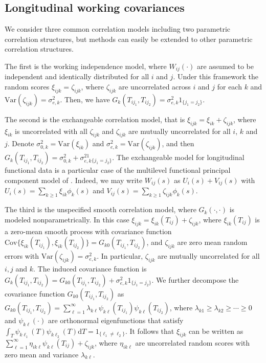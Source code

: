 \documentclass[submit]{smj}
\begin{document}
\subsection{Longitudinal working covariances}
We consider three common correlation models including two parametric correlation structures, but methods can easily be extended to other parametric correlation structures. 

The first is the working independence model, where $W_{ij}(\cdot)$ are assumed to be independent and identically distributed for all $i$ and $j$.
Under this framework the random scores $\xi_{ijk} = \zeta_{ijk}$, where $\zeta_{ijk}$ are uncorrelated across $i$ and $j$ for each $k$ and $\text{Var}(\zeta_{ijk}) = \sigma_{e, k}^2$. Then, we have $G_k(T_{ij_1},T_{ij_2}) = \sigma_{e, k}^2 1_{\{j_1= j_2\}}$.


The second is the exchangeable correlation model, that is
$\xi_{ijk} = \xi_{ik} + \zeta_{ijk}$, where $\xi_{ik}$ is uncorrelated with all $\zeta_{ijk}$
and $\zeta_{ijk}$ are mutually uncorrelated for all $i$, $k$ and $j$. Denote $\sigma_{0, k}^2 =  \text{Var}(\xi_{ik})$ and $\sigma_{e, k}^2 =  \text{Var}(\zeta_{ijk})$, and then
$G_k(T_{ij_1},T_{ij_2}) = \sigma_{0, k}^2+\sigma_{e, k}^21_{\{j_1=j_2\}}$. The exchangeable model for longitudinal functional data is a particular case of the multilevel functional principal component model of \citet{Di2009}. Indeed, we may write $W_{ij}(s)$ as $U_i(s) + V_{ij}(s)$ with $U_i(s) = \sum_{k\geq 1} \xi_{ik}\phi_k(s)$ and $V_{ij}(s) = \sum_{k \geq 1} \zeta_{ijk} \phi_k(s)$. 


The third is the unspecified  smooth correlation model, where $G_k(\cdot,\cdot)$ is modeled nonparametrically. In this case $\xi_{ijk} = \xi_{ik}(T_{ij}) + \zeta_{ijk}$, where $\xi_{ik}(T_{ij})$ is a zero-mean smooth process with covariance function $\text{Cov}\big\{\xi_{ik}(T_{ij_1}), \xi_{ik}(T_{ij_2})\big\} = G_{k0}(T_{ij_1}, T_{ij_2})$, and $\zeta_{ijk}$ are zero mean random errors with $\text{Var}(\zeta_{ijk}) = \sigma_{e,k}^2$. In particular, $\zeta_{ijk}$ are mutually uncorrelated for all $i, j$ and $k$. The induced covariance function is $G_k(T_{ij_1},T_{ij_2})= G_{k0}(T_{ij_1}, T_{ij_2}) + \sigma_{e, k}^2 1_{\{j_1=j_2\}}$. We further decompose the covariance function $G_{k0}(T_{ij_1}, T_{ij_2})$ as $G_{k0}(T_{ij_1}, T_{ij_2}) = \sum_{\ell=1}^{\infty} \lambda_{k\ell} \psi_{k\ell}(T_{ij_1})\psi_{k\ell}(T_{ij_2})$, where $\lambda_{k1}\geq \lambda_{k2}\geq\cdots\geq 0$ and $\psi_{k\ell}(\cdot)$ are orthonormal eigenfunctions that satisfy $\int_{T} \psi_{k\ell_1}(T)\psi_{k\ell_2}(T)\mathrm{d}T = 1_{\{\ell_1\neq \ell_2\}}$. It follows that $\xi_{ijk}$ can be written as $\sum_{\ell=1}^{\infty}\eta_{ik\ell}\psi_{k\ell}(T_{ij}) + \zeta_{ijk}$,
where $\eta_{ik\ell}$ are uncorrelated random scores with zero mean and variance $\lambda_{k\ell}$.
\end{document}

